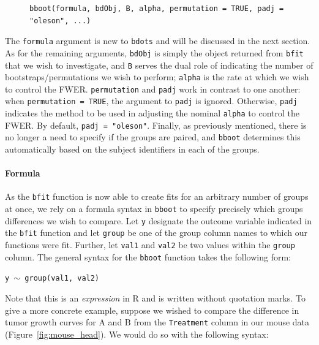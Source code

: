 \documentclass{article}
\newcommand{\xt}{\texttt}%
\begin{document}
\begin{singlespace}
\begin{figure}[H]
\centering
\begin{BVerbatim}
bboot(formula, bdObj, B, alpha, permutation = TRUE, padj = "oleson", ...)
\end{BVerbatim}

\end{figure}
\end{singlespace}

The \xt{formula} argument is new to  \xt{bdots} and will be discussed in the next section. As for the remaining arguments, \xt{bdObj} is simply the object returned from \xt{bfit} that we wish to investigate, and \xt{B} serves the dual role of indicating the number of bootstraps/permutations we wish to perform; \xt{alpha} is the rate at which we wish to control the FWER. \xt{permutation} and \xt{padj} work in contrast to one another: when \xt{permutation = TRUE}, the argument to \xt{padj} is ignored. Otherwise, \xt{padj} indicates the method to be used in adjusting the nominal \xt{alpha} to control the FWER. By default, \xt{padj = "oleson"}. Finally, as previously mentioned, there is no longer a need to specify if the groups are paired, and \xt{bboot} determines this automatically based on the subject identifiers in each of the groups.


\paragraph{Formula} \label{sec:formula}

As the \xt{bfit} function is now able to create fits for an arbitrary number of groups at once, we rely on a formula syntax in \xt{bboot} to specify precisely which groups differences we wish to compare. Let \xt{y} designate the outcome variable indicated in the \xt{bfit} function and let \xt{group} be one of the group column names to which our functions were fit. Further, let \xt{val1} and \xt{val2} be two values within the \xt{group} column. The general syntax for the \xt{bboot} function takes the following form:


\begin{center}
\tt y $\sim$ group(val1, val2)
\end{center}

Note that this is an \textit{expression} in R and is written without quotation marks. To give a more concrete example, suppose we wished to compare the difference in tumor growth curves for A and B from the \xt{Treatment} column in our mouse data (Figure~\ref{fig:mouse_head}). We would do so with the following syntax:
\end{document}

